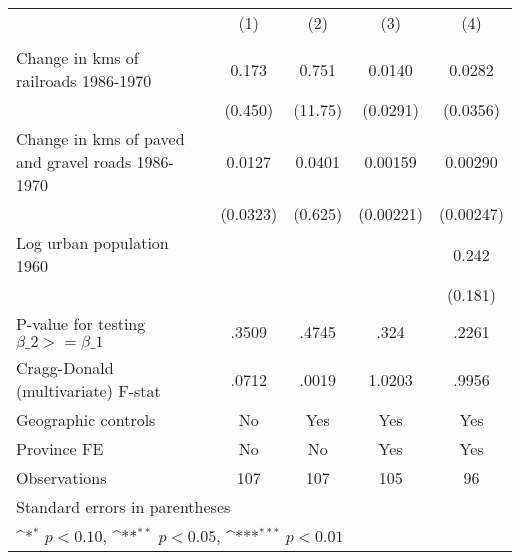 {
\def\sym#1{\ifmmode^{#1}\else\(^{#1}\)\fi}
\begin{tabular}{l*{4}{c}}
\hline\hline
                &\multicolumn{1}{c}{(1)}&\multicolumn{1}{c}{(2)}&\multicolumn{1}{c}{(3)}&\multicolumn{1}{c}{(4)}\\
                &\multicolumn{1}{c}{}&\multicolumn{1}{c}{}&\multicolumn{1}{c}{}&\multicolumn{1}{c}{}\\
\hline
Change in kms of railroads 1986-1970&    0.173         &    0.751         &   0.0140         &   0.0282         \\
                &  (0.450)         &  (11.75)         & (0.0291)         & (0.0356)         \\
[1em]
Change in kms of paved and gravel roads 1986-1970&   0.0127         &   0.0401         &  0.00159         &  0.00290         \\
                & (0.0323)         &  (0.625)         &(0.00221)         &(0.00247)         \\
[1em]
Log urban population 1960&                  &                  &                  &    0.242         \\
                &                  &                  &                  &  (0.181)         \\
\hline
P-value for testing $\beta\_{2} >= \beta\_{1}$&    .3509         &    .4745         &     .324         &    .2261         \\
Cragg-Donald (multivariate) F-stat&    .0712         &    .0019         &   1.0203         &    .9956         \\
Geographic controls&       No         &      Yes         &      Yes         &      Yes         \\
Province FE     &       No         &       No         &      Yes         &      Yes         \\
Observations    &      107         &      107         &      105         &       96         \\
\hline\hline
\multicolumn{5}{l}{\footnotesize Standard errors in parentheses}\\
\multicolumn{5}{l}{\footnotesize \sym{*} \(p<0.10\), \sym{**} \(p<0.05\), \sym{***} \(p<0.01\)}\\
\end{tabular}
}
